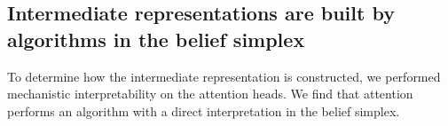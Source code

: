 \documentclass{article}
\theoremstyle{plain}
\theoremstyle{definition}
\theoremstyle{remark}
\begin{document}
\subsection{Intermediate representations are built by algorithms in the belief simplex}
To determine how the intermediate representation is constructed, we performed mechanistic interpretability on the attention heads. We find that attention performs an algorithm with a direct interpretation in the belief simplex.
\end{document}

